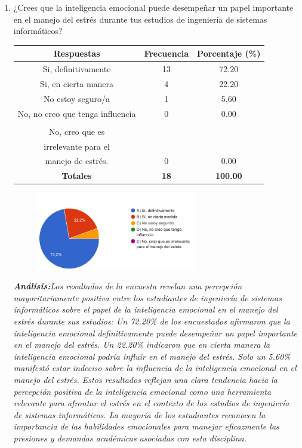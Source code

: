\documentclass[journal]{IEEEtran}
\begin{document}
\begin{enumerate}
\item¿Crees que la inteligencia emocional puede desempeñar un papel importante en el manejo del estrés durante tus estudios de ingeniería de sistemas informáticos?
	\begin{table}[H]
		\renewcommand{\arraystretch}{1.3}
		\centering
		\begin{tabular}{c c c}
			\hline
			\textbf{Respuestas} & \textbf{Frecuencia} & \textbf{Porcentaje (\%)}\\
			\hline
			Si, definitivamente & 13 & 72.20 \\
			Si, en cierta manera & 4 & 22.20 \\
			No estoy seguro/a & 1 & 5.60\\
			No, no creo que tenga influencia & 0 & 0.00\\
			\\No, creo que es\\ irrelevante para el\\ manejo de estrés. & 0 & 0.00\\
			\hline
			\textbf{Totales} &\textbf{18}& \textbf{100.00}\\
			\hline
		\end{tabular}
	\end{table}
	\begin{figure}[h]
		\centering
		\includegraphics[width=07cm]{Pregunta12}
	\end{figure}
	\textit{\textbf{Análisis:}Los resultados de la encuesta revelan una percepción mayoritariamente positiva entre los estudiantes de ingeniería de sistemas informáticos sobre el papel de la inteligencia emocional en el manejo del estrés durante sus estudios:
Un 72.20\% de los encuestados afirmaron que la inteligencia emocional definitivamente puede desempeñar un papel importante en el manejo del estrés.
Un 22.20\% indicaron que en cierta manera la inteligencia emocional podría influir en el manejo del estrés.
Solo un 5.60\% manifestó estar indeciso sobre la influencia de la inteligencia emocional en el manejo del estrés.
Estos resultados reflejan una clara tendencia hacia la percepción positiva de la inteligencia emocional como una herramienta relevante para afrontar el estrés en el contexto de los estudios de ingeniería de sistemas informáticos. La mayoría de los estudiantes reconocen la importancia de las habilidades emocionales para manejar eficazmente las presiones y demandas académicas asociadas con esta disciplina.
}
\end{enumerate}
\end{document}
